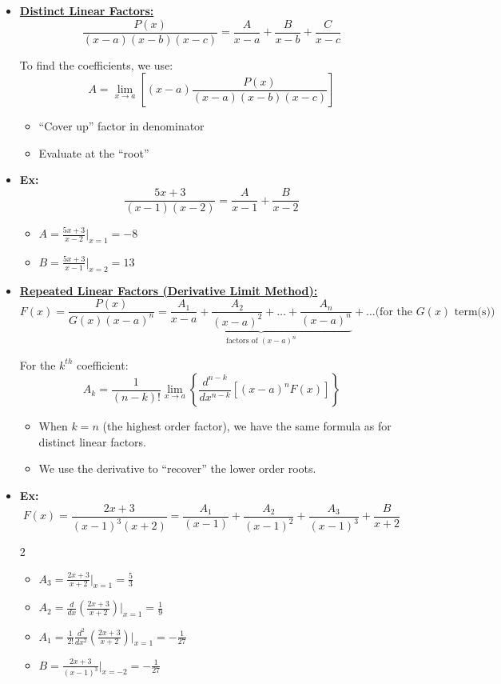 \documentclass[12pt]{article}
\begin{document}
\begin{itemize}
    \item \underline{\textbf{Distinct Linear Factors:}}
    \[ \frac{P(x)}{(x-a)(x-b)(x-c)} = \frac{A}{x-a} + \frac{B}{x-b} + \frac{C}{x-c} \]
    
    To find the coefficients, we use:
    \[A = \lim_{x \to a} \left[ (x-a) \frac{P(x)}{(x-a)(x-b)(x-c)} \right]\]
    \begin{itemize}
        \item ``Cover up'' factor in denominator
        \item Evaluate at the ``root''
    \end{itemize}

    \item \textbf{Ex:}
    \[ \frac{5x+3}{(x-1)(x-2)} = \frac{A}{x-1} + \frac{B}{x-2} \]
    \begin{itemize}
        \item[] $A = \frac{5x+3}{x-2} \Big|_{x=1} = -8$
        \item[] $B = \frac{5x+3}{x-1} \Big|_{x=2} = 13$
    \end{itemize}
\end{itemize}

\begin{itemize}
    \item \underline{\textbf{Repeated Linear Factors (Derivative Limit Method):}}
    \[ F(x) = \frac{P(x)}{G(x)(x-a)^n} = \underbrace{\frac{A_1}{x-a} + \frac{A_2}{(x-a)^2} + \dots + \frac{A_n}{(x-a)^n}}_{\text{factors of } (x-a)^n} + \dots \text{(for the } G(x) \text{ term(s))} \]

    For the $k^{th}$ coefficient:
    \[ A_k = \frac{1}{(n-k)!} \lim_{x \to a} \left\{ \frac{d^{n-k}}{dx^{n-k}} \left[ (x-a)^n F(x) \right]\right\} \]
    \begin{itemize}
        \item When $k=n$ (the highest order factor), we have the same formula as for distinct linear factors.
        \item We use the derivative to ``recover'' the lower order roots.
    \end{itemize}

    \item \textbf{Ex:}
    \[ F(x) = \frac{2x+3}{(x-1)^3(x+2)} = \frac{A_1}{(x-1)} + \frac{A_2}{(x-1)^2} + \frac{A_3}{(x-1)^3} + \frac{B}{x+2} \]
    \begin{multicols}{2}
        \begin{itemize}
        \item[] $A_3 = \frac{2x+3}{x+2} \Big|_{x=1} = \frac{5}{3}$
        \item[] $A_2 = \frac{d}{dx} \left( \frac{2x+3}{x+2} \right) \Big|_{x=1} = \frac{1}{9}$
        \item[] $A_1 = \frac{1}{2!} \frac{d^2}{dx^2} \left( \frac{2x+3}{x+2} \right) \Big|_{x=1} = -\frac{1}{27}$
        \item[] $B = \frac{2x+3}{(x-1)^3} \Big|_{x=-2} = -\frac{1}{27}$
        \end{itemize}
    \end{multicols}
\end{itemize}
\end{document}
